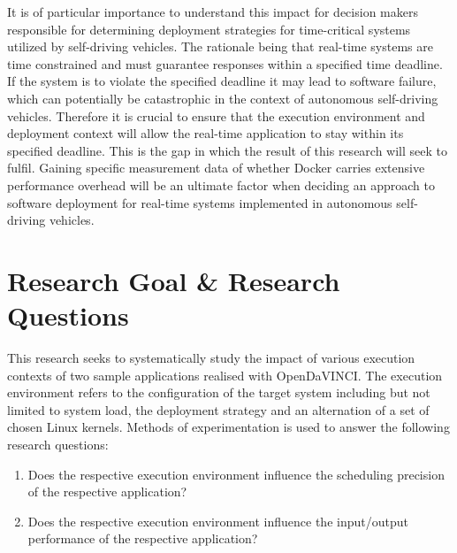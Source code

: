 It is of particular importance to understand this impact for decision makers responsible for determining deployment strategies for time-critical systems utilized by self-driving vehicles. The rationale being that real-time systems are time constrained and must guarantee responses within a specified time deadline. If the system is to violate the specified deadline it may lead to software failure, which can potentially be catastrophic in the context of autonomous self-driving vehicles. Therefore it is crucial to ensure that the execution environment and deployment context will allow the real-time application to stay within its specified deadline. This is the gap in which the result of this research will seek to fulfil. Gaining specific measurement data of whether Docker carries extensive performance overhead will be an ultimate factor when deciding an approach to software deployment for real-time systems implemented in autonomous self-driving vehicles.\\

\section{Research Goal \& Research Questions}
This research seeks to systematically study the impact of various execution contexts of two sample applications realised with OpenDaVINCI. The execution environment refers to the configuration of the target system including but not limited to system load, the deployment strategy and an alternation of a set of chosen Linux kernels. Methods of experimentation is used to answer the following research questions:\\

\begin{enumerate}[label=\textbf{RQ\arabic*}]
\label{section:rqs}
	\item Does the respective execution environment influence the scheduling precision of the respective application?
	\item Does the respective execution environment influence the input/output performance of the respective application?\\
\end{enumerate}





